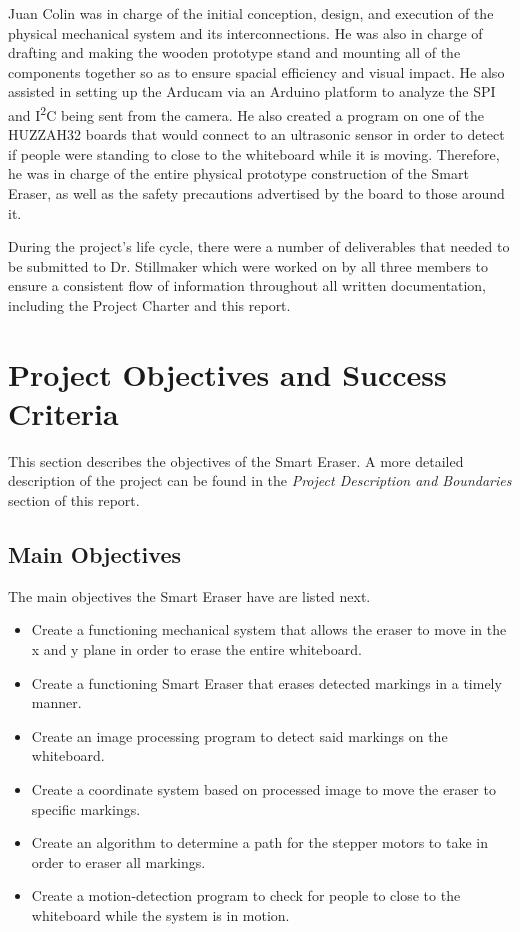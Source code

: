  \par
\setlength{\parindent}{2.5ex} Juan Colin was in charge of the initial conception, design, and execution of the physical mechanical system and its interconnections. He was also in charge of drafting and making the wooden prototype stand and mounting all of the components together so as to ensure spacial efficiency and visual impact. He also assisted in setting up the Arducam via an Arduino platform to analyze the SPI and I\textsuperscript{2}C being sent from the camera. He also created a program on one of the HUZZAH32 boards that would connect to an ultrasonic sensor in order to detect if people were standing to close to the whiteboard while it is moving. Therefore, he was in charge of the entire physical prototype construction of the Smart Eraser, as well as the safety precautions advertised by the board to those around it.
 \par
\setlength{\parindent}{2.5ex} During the project's life cycle, there were a number of deliverables that needed to be submitted to Dr. Stillmaker which were worked on by all three members to ensure a consistent flow of information throughout all written documentation, including the Project Charter and this report.

 \section{Project Objectives and Success Criteria}
This section describes the objectives of the Smart Eraser. A more detailed description of the project can be found in the \textit{Project Description and Boundaries} section of this report.
\subsection{Main Objectives}
The main objectives the Smart Eraser have are listed next.
 \begin{itemize}
 \item Create a functioning mechanical system that allows the eraser to move in the x and y plane in order to erase the entire whiteboard.
 \item Create a functioning Smart Eraser that erases detected markings in a timely manner.
 \item Create an image processing program to detect said markings on the whiteboard.
 \item Create a coordinate system based on processed image to move the eraser to specific markings.
 \item Create an algorithm to determine a path for the stepper motors to take in order to eraser all markings.
 \item Create a motion-detection program to check for people to close to the whiteboard while the system is in motion.
 \end{itemize} \par

